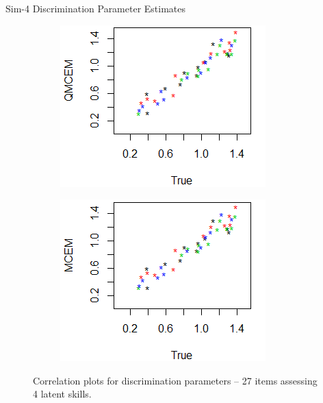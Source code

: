 \documentclass{beamer}
\theoremstyle{definition}
\begin{document}
\begin{frame}{Sim-4 Discrimination Parameter Estimates}
\begin{figure}[h]
\begin{subfigure}{.32\textwidth}
      \includegraphics[width=.9\linewidth]{../img/ml_journal_results/4skills/qmcem_disc_4skills_cropped.png}
    \end{subfigure}
    \begin{subfigure}{.32\textwidth}
      \centering
      \includegraphics[width=.9\linewidth]{../img/ml_journal_results/4skills/mcem_disc_4skills_cropped.png}
    \end{subfigure}
    \caption*{\scriptsize Correlation plots for discrimination parameters -- 27 items assessing 4 latent skills.}
    \label{fig:4skills_disc}
\end{figure}
\end{frame}
\end{document}
